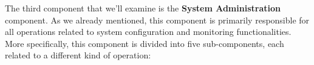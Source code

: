\begin{figure}[H]
\centering
{}
\end{figure}

The third component that we'll examine is the \textbf{System Administration} component. As we already mentioned, this component is primarily responsible for all operations related to system configuration and monitoring functionalities. More specifically, this component is divided into five sub-components, each related to a different kind of operation:	
